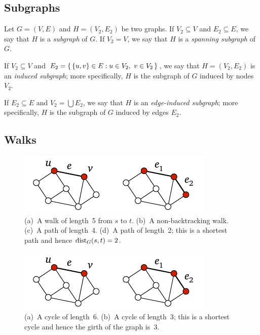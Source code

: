 \subsection{Subgraphs}

Let $G = (V,E)$ and $H = (V_2,E_2)$ be two graphs. If $V_2 \subseteq V$ and $E_2 \subseteq E$, we say that $H$ is a \emph{subgraph} of $G$. If $V_2 = V$, we say that $H$ is a \emph{spanning subgraph} of $G$.

If $V_2 \subseteq V$ and $E_2 = \{\,  \{u,v\} \in E : u \in V_2,\ v \in V_2  \,\}$, we say that $H = (V_2,E_2)$ is an \emph{induced subgraph}; more specifically, $H$ is the subgraph of $G$ induced by nodes $V_2$.

If $E_2 \subseteq E$ and $V_2 = \bigcup E_2$, we say that $H$ is an \emph{edge-induced subgraph}; more specifically, $H$ is the subgraph of $G$ induced by edges $E_2$.


\subsection{Walks}

\begin{figure}
    \centering
    \includegraphics[page=\PWalk]{figs.pdf}
    \caption{
        (a)~A walk of length~5 from $s$ to $t$.
        (b)~A non-backtracking walk.
        (c)~A path of length~4.
        (d)~A path of length~2; this is a shortest path and hence $\operatorname{dist}_G(s,t) = 2$.
    }\label{fig:walk}
\end{figure}

\begin{figure}
    \centering
    \includegraphics[page=\PCycle]{figs.pdf}
    \caption{
        (a)~A cycle of length~6.
        (b)~A cycle of length~3; this is a shortest cycle and hence the girth of the graph is~$3$.
    }\label{fig:cycle}
\end{figure}

